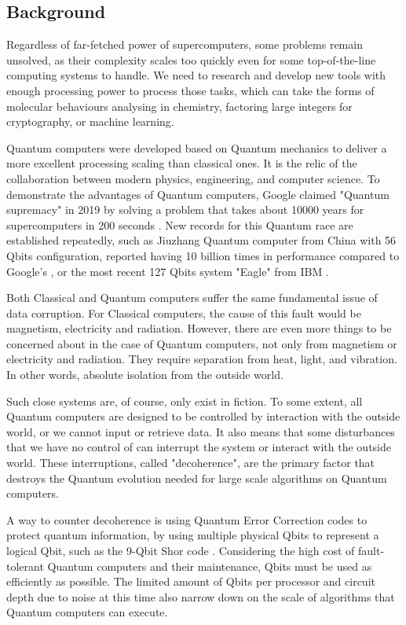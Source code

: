 \subsection{Background}

Regardless of  far-fetched power of supercomputers, some problems remain unsolved, as their complexity scales too quickly even for some top-of-the-line computing systems to handle. 
We need to research and develop new tools with enough processing power to process those tasks, which can take the forms of molecular behaviours analysing in chemistry, factoring large integers for cryptography, or machine learning.

Quantum computers were developed based on Quantum mechanics to deliver a more excellent processing scaling than classical ones.
It is the relic of the collaboration between modern physics, engineering, and computer science.
To demonstrate the advantages of Quantum computers, Google claimed "Quantum supremacy" in 2019 by solving a problem that takes about 10000 years for supercomputers in 200 seconds \cite{hsuGoogleQuantumTech2019}.
New records for this Quantum race are established repeatedly, such as Jiuzhang Quantum computer from China with 56 Qbits configuration, reported having 10 billion times in performance compared to Google's \cite{zhongQuantumComputationalAdvantage2020}, or the most recent 127 Qbits system "Eagle" from IBM \cite{chow2021ibm}.

Both Classical and Quantum computers suffer the same fundamental issue of data corruption.
For Classical computers, the cause of this fault would be magnetism, electricity and radiation.
However, there are even more things to be concerned about in the case of Quantum computers, not only from magnetism or electricity and radiation. They require separation from heat, light, and vibration. In other words, absolute isolation from the outside world.

Such close systems are, of course, only exist in fiction. 
To some extent, all Quantum computers are designed to be controlled by interaction with the outside world, or we cannot input or retrieve data.
It also means that some disturbances that we have no control of can interrupt the system or interact with the outside world.
These interruptions, called "decoherence", are the primary factor that destroys the Quantum evolution needed for large scale algorithms on Quantum computers.

A way to counter decoherence is using Quantum Error Correction codes \cite{lidar2013quantum} to protect quantum information, by using multiple physical Qbits to represent a logical Qbit, such as the 9-Qbit Shor code \cite{shor1995scheme}.
Considering the high cost of fault-tolerant Quantum computers and their maintenance, Qbits must be used as efficiently as possible. 
The limited amount of Qbits per processor and circuit depth due to noise at this time also narrow down on the scale of algorithms that Quantum computers can execute.

